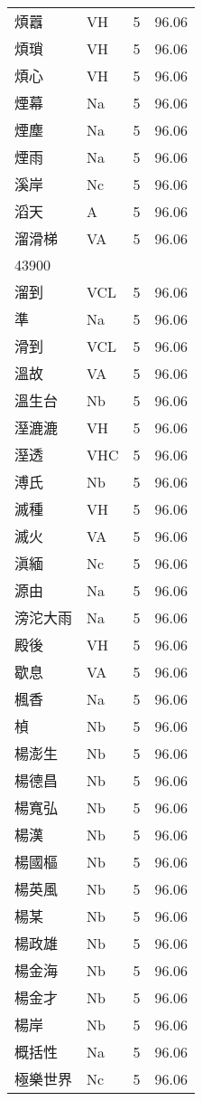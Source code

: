 \documentclass[twocolumn]{book}
\begin{document}
\begin{supertabular}{llrr}
煩囂 & VH & 5 &  96.06\\
煩瑣 & VH & 5 &  96.06\\
煩心 & VH & 5 &  96.06\\
煙幕 & Na & 5 &  96.06\\
煙塵 & Na & 5 &  96.06\\
煙雨 & Na & 5 &  96.06\\
溪岸 & Nc & 5 &  96.06\\
滔天 & A & 5 &  96.06\\
溜滑梯 & VA & 5 &  96.06\\
43900\\
溜到 & VCL & 5 &  96.06\\
準 & Na & 5 &  96.06\\
滑到 & VCL & 5 &  96.06\\
溫故 & VA & 5 &  96.06\\
溫生台 & Nb & 5 &  96.06\\
溼漉漉 & VH & 5 &  96.06\\
溼透 & VHC & 5 &  96.06\\
溥氏 & Nb & 5 &  96.06\\
滅種 & VH & 5 &  96.06\\
滅火 & VA & 5 &  96.06\\
滇緬 & Nc & 5 &  96.06\\
源由 & Na & 5 &  96.06\\
滂沱大雨 & Na & 5 &  96.06\\
殿後 & VH & 5 &  96.06\\
歇息 & VA & 5 &  96.06\\
楓香 & Na & 5 &  96.06\\
楨 & Nb & 5 &  96.06\\
楊澎生 & Nb & 5 &  96.06\\
楊德昌 & Nb & 5 &  96.06\\
楊寬弘 & Nb & 5 &  96.06\\
楊漢 & Nb & 5 &  96.06\\
楊國樞 & Nb & 5 &  96.06\\
楊英風 & Nb & 5 &  96.06\\
楊某 & Nb & 5 &  96.06\\
楊政雄 & Nb & 5 &  96.06\\
楊金海 & Nb & 5 &  96.06\\
楊金才 & Nb & 5 &  96.06\\
楊岸 & Nb & 5 &  96.06\\
概括性 & Na & 5 &  96.06\\
極樂世界 & Nc & 5 &  96.06\\

\end{supertabular}
\end{document}
